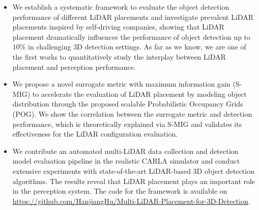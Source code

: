 \documentclass[10pt,twocolumn,letterpaper]{article}
\begin{document}
\begin{itemize}
    \item We establish a systematic framework to evaluate the object detection performance of different LiDAR placements and investigate prevalent LiDAR placements inspired by self-driving companies, showing that LiDAR placement dramatically influences the performance of object detection up to 10\% in challenging 3D detection settings. As far as we know, we are one of the first works to quantitatively study the interplay between LiDAR placement and perception performance.

    \item We propose a novel surrogate metric with maximum information gain (S-MIG) to accelerate the evaluation of LiDAR placement by modeling object distribution through the proposed scalable Probabilistic Occupancy Grids (POG). We show the correlation between the surrogate metric and detection performance, which is theoretically explained via S-MIG and validates its effectiveness for the LiDAR configuration evaluation.

    \item  We contribute an automated multi-LiDAR data collection and detection model evaluation pipeline in the realistic CARLA simulator and conduct extensive experiments with state-of-the-art LiDAR-based 3D object detection algorithms. The results reveal that LiDAR placement plays an important role in the perception system. The code for the framework is available on \url{https://github.com/HanjiangHu/Multi-LiDAR-Placement-for-3D-Detection}.


\end{itemize}
\end{document}
